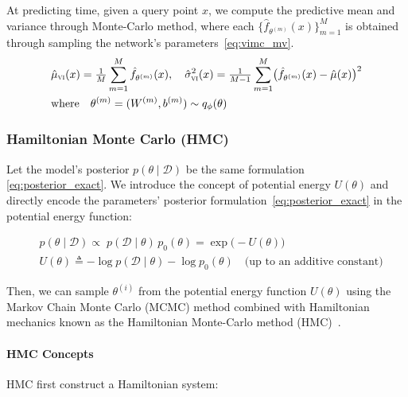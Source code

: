 \documentclass[preprint,12pt]{elsarticle}
\begin{document}
At predicting time, given a query point $x$, we compute the predictive mean and variance through Monte-Carlo method, where each $\{\hat f_{\theta^{(m)}}(x)\}_{m=1}^{M}$ is obtained through sampling the network's parameters~\eqref{eq:vimc_mv}. 
\begin{equation}
    \begin{aligned}
    &\hat\mu_{\textsc{vi}}(x)=\tfrac1M\sum_{m=1}^{M}\hat f_{\theta^{(m)}}(x),
    \quad
    \hat\sigma_{\textsc{vi}}^{2}(x)=
    \tfrac1{M-1}\sum_{m=1}^{M}
    \bigl(\hat f_{\theta^{(m)}}(x)-\hat\mu(x)\bigr)^{2} \\
    &\text{where} \quad
    \theta^{(m)} = (W^{(m)}, b^{(m)}) \sim q_{\phi}(\theta) 
    \label{eq:vimc_mv}
    \end{aligned}
\end{equation}
\noindent

\subsubsection{Hamiltonian Monte Carlo (HMC)}
\label{sec:sub:hmc}

Let the model's posterior $p(\theta\mid\mathcal D)$ be the same formulation \eqref{eq:posterior_exact}. We introduce the concept of potential energy $U(\theta)$ and directly encode the parameters' posterior formulation~\eqref{eq:posterior_exact} in the potential energy function:


\begin{align}
    &p(\theta\mid\mathcal D)
    \propto\;
    p(\mathcal D\mid\theta)\,p_0(\theta)
    = \exp\!\bigl(-U(\theta)\bigr)
    \label{eq:hmc_posterior} \\[1ex]
    &U(\theta)
    \triangleq -\log p(\mathcal D\mid\theta) - \log p_0(\theta)
    \quad \text{(up to an additive constant)}
    \label{eq:potential}
\end{align}

\noindent
Then, we can sample $\theta^{(i)}$ from the potential energy function $U(\theta)$ using the Markov Chain Monte Carlo (MCMC) method combined with Hamiltonian mechanics known as the Hamiltonian Monte-Carlo method (HMC)~\cite{neal_mcmc_2012, betancourt_conceptual_2018}.

\paragraph{HMC Concepts}
HMC first construct a Hamiltonian system:
\end{document}
